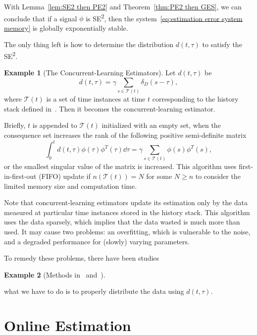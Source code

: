 \documentclass[]{IEEEtran}
\theoremstyle{definition}
\newtheorem{example}{Example}
\theoremstyle{remark}
\newcommand{\MC}[1]{\mathcal{#1}}
\newcommand{\tsup}[1]{\textsuperscript{#1}}
\begin{document}
With Lemma~\ref{lem:SE2 then PE2} and Theorem~\ref{thm:PE2 then GES}, we can
conclude that if a signal $\phi$ is SE\tsup{2}, then the
system~\eqref{eq:estimation error system memory} is globally exponentially
stable.

The only thing left is how to determine the distribution $d(t, \tau)$ to
satisfy the SE\tsup{2}.

\begin{example}[The Concurrent-Learning Estimators]
	Let $d(t, \tau)$ be
	\begin{equation*}
		d(t, \tau) = \gamma \sum_{s \in \MC{T}(t)} \delta_D(s - \tau),
	\end{equation*}
	where $\MC{T}(t)$ is a set of time instances at time $t$ corresponding to the
	history stack defined in~\cite{chowdhary_exponential_2014}. Then it becomes
	the concurrent-learning estimator.

	Briefly, $t$ is appended to $\MC{T}(t)$ initialized with an empty set, when
	the consequence set increases the rank of the following positive
	semi-definite matrix
	\begin{equation*}
		\int_0^t d(t, \tau) \phi(\tau) \phi^T(\tau) \dd{\tau} = \gamma \sum_{s \in
		\MC{T}(t)} \phi(s) \phi^T(s),
	\end{equation*}
	or the smallest singular value of the matrix is increased.  This algorithm
	uses first-in-first-out (FIFO) update if $n(\MC{T}(t)) = N$ for some $N \ge
	n$ to consider the limited memory size and computation time.
\end{example}

Note that concurrent-learning estimators update its estimation only by the data
measured at particular time instances stored in the history stack. This
algorithm uses the data sparsely, which implies that the data wasted is much
more than used. It may cause two problems: an overfitting, which is vulnerable
to the noise, and a degraded performance for (slowly) varying parameters.

To remedy these problems, there have been studies 

\begin{example}[Methods in~\cite{cho_composite_2018}
	and~\cite{pan_composite_2018}]
\end{example}

what we have to do is to properly distribute the data using $d(t,
\tau)$.


\section{Online Estimation}
\end{document}
